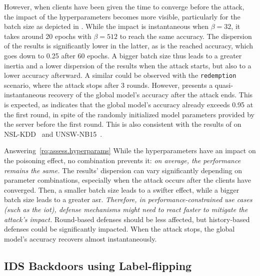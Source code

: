 However, when clients have been given the time to converge before the attack, the impact of the hyperparameters becomes more visible, particularly for the batch size as depicted in .
While the impact is instantaneous when $\beta=32$, it takes around 20 epochs with $\beta=512$ to reach the same accuracy.
The dispersion of the results is significantly lower in the latter, as is the reached accuracy, which goes down to 0.25 after 60 epochs.
A bigger batch size thus leads to a greater inertia and a lower dispersion of the results when the attack starts, but also to a lower accuracy afterward.
A similar could be observed with the \texttt{redemption} scenario, where the attack stops after 3 rounds.
However,  presents a quasi-instantaneous recovery of the global model's accuracy after the attack ends.
This is expected, as  indicates that the global model's accuracy already exceeds 0.95 at the first round, in spite of the randomly initialized model parameters provided by the server before the first round.
This is also consistent with the results of \textcite{zhang_Evaluationdatapoisoning_2022} on NSL-KDD~\cite{tavallaee_detailedanalysisKDD_2009} and UNSW-NB15~\cite{moustafa_UNSWNB15comprehensivedata_2015}.


\begin{answerbox}{Answering~\ref{rq:assess.hyperparams} \normalfont\itshape\rqparams}
  While the hyperparameters have an impact on the poisoning effect, no combination prevents it: \emph{on average, the performance remains the same.}
  The results' dispersion can vary significantly depending on parameter combinations, especially when the attack occurs after the clients have converged.
  Then, a smaller batch size leads to a swifter effect, while a bigger batch size leads to a greater \gls{asr}.
  \emph{Therefore, in performance-constrained use cases (such as the \gls{iot}), defense mechanisms might need to react faster to mitigate the attack's impact.}
  Round-based defenses should be less affected, but history-based defenses could be significantly impacted.
  When the attack stops, the global model's accuracy recovers almost instantaneously.
\end{answerbox}




\subsection{IDS Backdoors using Label-flipping\label{sec:assess.results.backdoors}}

